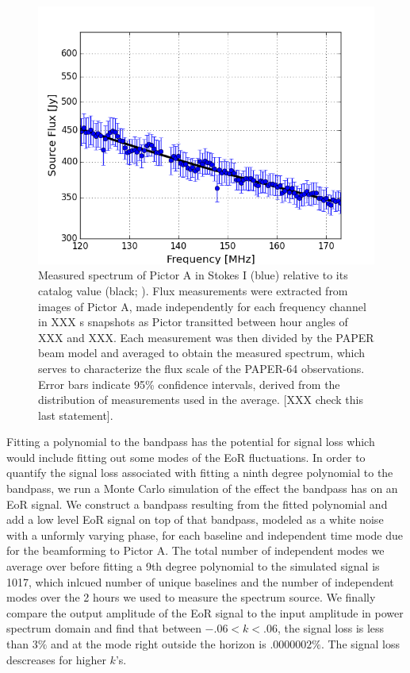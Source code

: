 \documentclass[twocolumn,numberedappendix]{emulateapj} \shorttitle{PSA64}
\begin{document}
\begin{figure}[!t]
\centering
\includegraphics[width=\columnwidth]{plots/picspec.png}
\caption{
Measured spectrum of Pictor A in Stokes I (blue) relative to its catalog
value (black; \citealt{jacobs_et_al2013}).  Flux measurements were
extracted from images of Pictor A, made independently for each frequency channel in
XXX s snapshots as Pictor transitted between hour angles of XXX and XXX.  
Each measurement was then divided by the PAPER beam model and averaged to
obtain the measured spectrum, which serves to characterize the flux scale
of the PAPER-64 observations.  Error bars indicate 95\% confidence intervals,
derived from the distribution of measurements used in the average.
[XXX check this last statement].
}\label{fig:pic_spec}
\end{figure}

Fitting a polynomial to the bandpass has the potential for signal loss which
would include fitting out some modes of the EoR fluctuations. In order to
quantify the signal loss associated with fitting a ninth degree polynomial to
the bandpass, we run a Monte Carlo simulation of the effect the bandpass has on
an EoR signal. We construct a bandpass resulting from the fitted
polynomial and add a low level EoR signal on top of that bandpass, modeled as a
white noise with a unformly varying phase, for each baseline and independent
time mode due for the beamforming to Pictor A. The total number of independent
modes we average over before fitting a 9th degree polynomial to the simulated
signal is 1017, which inlcued number of unique baselines and the number of
independent modes over the 2 hours we used to measure the spectrum source. We
finally compare the output amplitude of the EoR signal to the input amplitude in
power spectrum domain and find that between $-.06 < k < .06$, the signal loss is
less than $3\%$ and at the mode right outside the horizon is $.0000002\%$. The
signal loss descreases for higher $k$'s.
\end{document}
